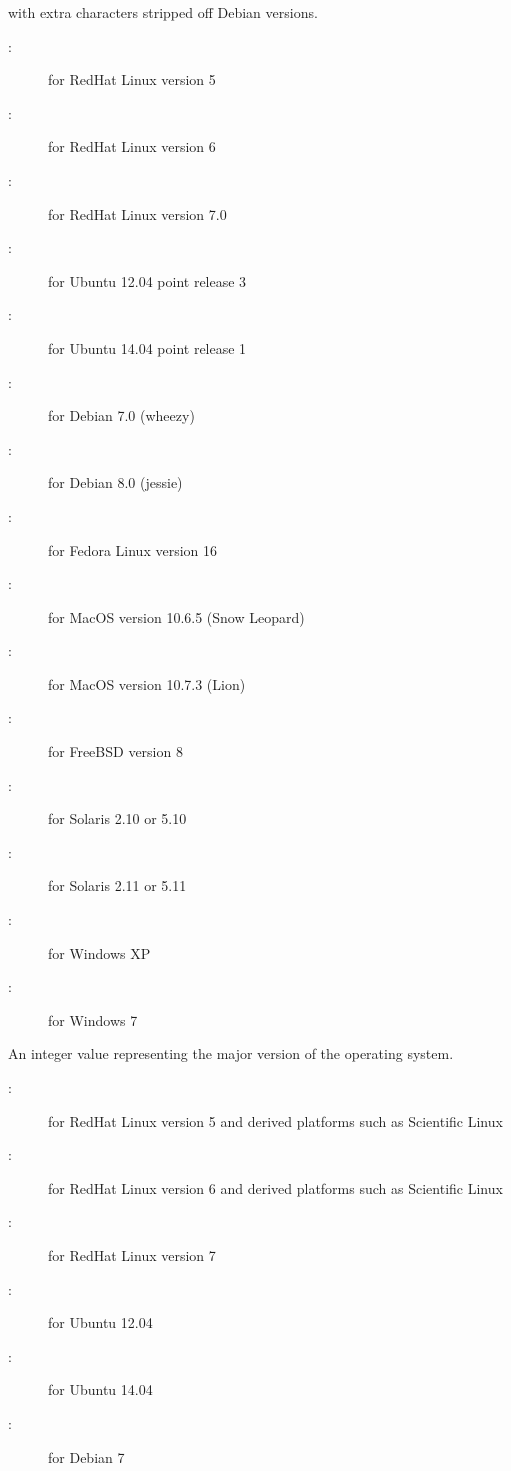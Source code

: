 \begin{description}
with extra characters stripped off Debian versions.
	\begin{description}
	\item[:] for RedHat Linux version 5
	\item[:] for RedHat Linux version 6
	\item[:] for RedHat Linux version 7.0
	\item[:] for Ubuntu 12.04 point release 3 
	\item[:] for Ubuntu 14.04 point release 1 
	\item[:] for Debian 7.0 (wheezy)
	\item[:] for Debian 8.0 (jessie)
	\item[:] for Fedora Linux version 16
	\item[:] for MacOS version 10.6.5 (Snow Leopard)
	\item[:] for MacOS version 10.7.3 (Lion)
	\item[:] for FreeBSD version 8
	\item[:] for Solaris 2.10 or 5.10
	\item[:] for Solaris 2.11 or 5.11
	\item[:] for Windows XP
	\item[:] for Windows 7
	\end{description}
%
\item[\AdAttr{OpSysMajorVersion}:] An integer value representing the major version of the operating system.
	\begin{description}
	\item[:] for RedHat Linux version 5 
and derived platforms such as Scientific Linux
	\item[:] for RedHat Linux version 6
and derived platforms such as Scientific Linux
	\item[:] for RedHat Linux version 7
	\item[:] for Ubuntu 12.04
	\item[:] for Ubuntu 14.04
	\item[:] for Debian 7 

\end{description}
\end{description}
